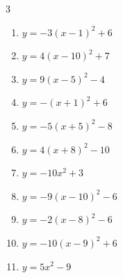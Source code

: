 \begin{multicols}{3}
\begin{enumerate}
        \phantom{$\displaystyle 頂点\left( 7 , 9 \right)$}

  \item $\displaystyle y=-3\left( x-1\right)^{2}+6$

        \phantom{$\displaystyle 頂点\left( 1 , 6 \right)$}

  \item $\displaystyle y=4\left( x-10\right)^{2}+7$

        \phantom{$\displaystyle 頂点\left( 10 , 7 \right)$}

\columnbreak %

  \item $\displaystyle y=9\left( x-5\right)^{2}-4$

        \phantom{$\displaystyle 頂点\left( 5 , -4 \right)$}

  \item $\displaystyle y=-\left( x+1\right)^{2}+6$

        \phantom{$\displaystyle 頂点\left( -1 , 6 \right)$}

  \item $\displaystyle y=-5\left( x+5\right)^{2}-8$

        \phantom{$\displaystyle 頂点\left( -5 , -8 \right)$}

  \item $\displaystyle y=4\left( x+8\right)^{2}-10$

        \phantom{$\displaystyle 頂点\left( -8 , -10 \right)$}

  \item $\displaystyle y=-10x^{2}+3$

        \phantom{$\displaystyle 頂点\left( 0 , 3 \right)$}

  \item $\displaystyle y=-9\left( x-10\right)^{2}-6$

        \phantom{$\displaystyle 頂点\left( 10 , -6 \right)$}

  \item $\displaystyle y=-2\left( x-8\right)^{2}-6$

        \phantom{$\displaystyle 頂点\left( 8 , -6 \right)$}

  \item $\displaystyle y=-10\left( x-9\right)^{2}+6$

        \phantom{$\displaystyle 頂点\left( 9 , 6 \right)$}

  \item $\displaystyle y=5x^{2}-9$


\end{enumerate}
\end{multicols}
